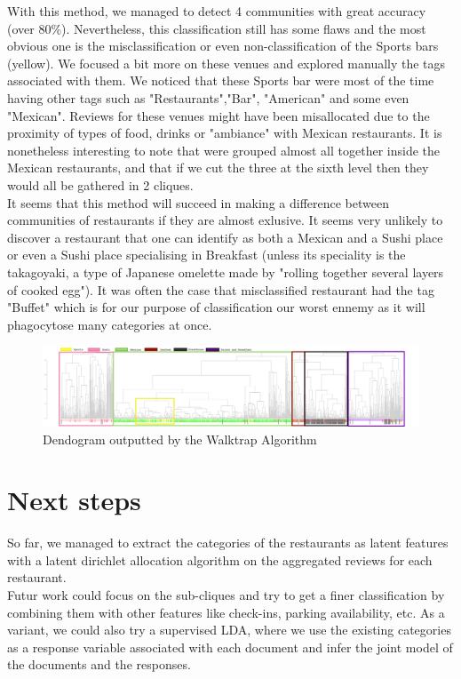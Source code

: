 \documentclass[twoside]{article}
\begin{document}
\begin{multicols}{2}
\noindent With this method, we managed to detect 4 communities with great accuracy (over 80\%). Nevertheless, this classification still has some flaws and the most obvious one is the misclassification or even non-classification of the Sports bars (yellow). We focused a bit more on these venues and explored manually the tags associated with them. We noticed that these Sports bar were most of the time having other tags such as "Restaurants","Bar", "American" and some even "Mexican". Reviews for these venues might have been misallocated due to the proximity of types of food, drinks or "ambiance" with Mexican restaurants. It is nonetheless interesting to note that were grouped almost all together inside the Mexican restaurants, and that if we cut the three at the sixth level then they would all be gathered in 2 cliques.\\

\noindent It seems that this method will succeed in making a difference between communities of restaurants if they are almost exlusive. It seems very unlikely to discover a restaurant that one can identify as both a Mexican and a Sushi place or even a Sushi place specialising in Breakfast (unless its speciality is the takagoyaki, a type of Japanese omelette made by "rolling together several layers of cooked egg"). It was often the case that misclassified restaurant had the tag "Buffet" which is for our purpose of classification our worst ennemy as it will phagocytose many categories at once.

\begin{figure}
\centering
\includegraphics[angle=90,width=0.25\linewidth]{img/den_ovi2-1.png}
\caption{Dendogram outputted by the Walktrap Algorithm}
\end{figure}


\section{Next steps}

So far, we managed to extract the categories of the restaurants as latent features with a latent dirichlet allocation algorithm on the aggregated reviews for each restaurant. \\

Futur work could focus on the sub-cliques and try to get a finer classification by combining them with other features like check-ins, parking availability, etc. As a variant, we could also try a supervised LDA, where we use the existing categories as a response variable associated with each document and infer the joint model of the documents and the responses.\\


\end{multicols}
\end{document}
